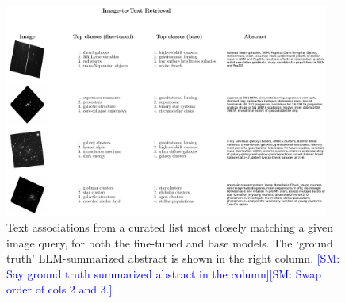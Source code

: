 \documentclass[10pt]{article} %
\newcommand{\SM}[1]{\textcolor{blue}{[SM: #1]}}
\begin{document}
\begin{figure}[!h]
\includegraphics[width=0.95\textwidth]{plots/itt.pdf}
\caption{Text associations from a curated list most closely matching a given image query, for both the fine-tuned and base models. The `ground truth' LLM-summarized abstract is shown in the right column. \SM{Say ground truth summarized abstract in the column}\SM{Swap order of cols 2 and 3.}}
\label{fig:itt}
\end{figure}
\end{document}
